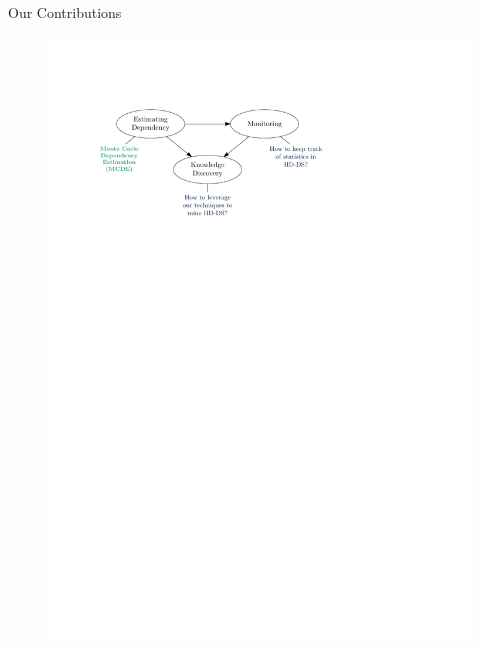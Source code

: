 \documentclass[16pt,usenames,dvipsnames, notheorems]{beamer}
\theoremstyle{definition}
\theoremstyle{example}
\theoremstyle{plain}
\begin{document}
\begin{frame}{Our Contributions}
\begin{figure}
\begin{overprint}
		 \includegraphics[width=1.0 \linewidth]{figures/outline_c_4-compressed.pdf}

\end{overprint}
\end{figure}
\end{frame}
\end{document}
